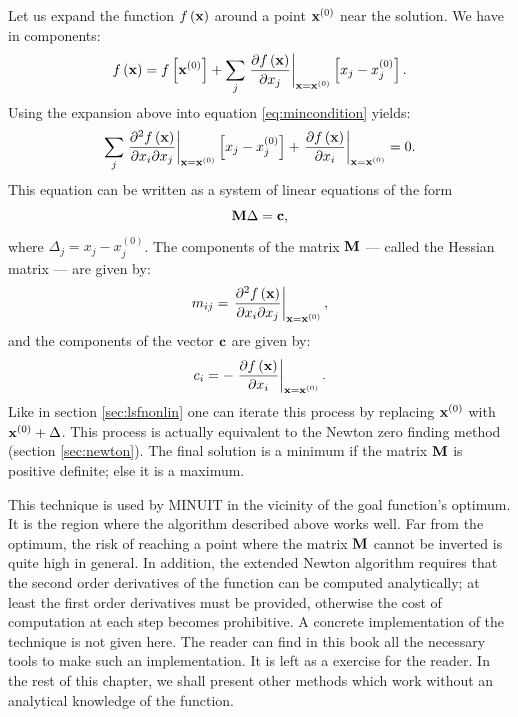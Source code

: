 Let us expand the function $f\left({\textbf x}\right)$ around a point
${\textbf x}^{\left(0\right)}$ near the solution.
We have in components:
\begin{equation}
  f\left({\textbf x}\right) = f\left[{\textbf x}^{\left(0\right)}\right] +\sum_j
  \left.{\partial f\left({\textbf x}\right) \over \partial x_j}\right|_{{\textbf x}={\textbf
  x}^{\left(0\right)}}
  \left[x_j-x^{\left(0\right)}_j\right].
\end{equation}
Using the expansion above into equation \ref{eq:mincondition}
yields:
\begin{equation}
\sum_j
  \left.{\partial^2 f\left({\textbf x}\right) \over \partial x_i\partial x_j}\right|_{{\textbf x}={\textbf
  x}^{\left(0\right)}}
  \left[x_j-x^{\left(0\right)}_j\right]
  + \left.{\partial f\left({\textbf x}\right) \over \partial x_i}\right|_{{\textbf x}={\textbf
  x}^{\left(0\right)}} =0.
\end{equation}
This equation can be written as a system of linear equations of
the form
\begin{equation}
  {\textbf M}\Delta = {\textbf c},
\end{equation}
where $\Delta_j =x_j-x^{\left(0\right)}_j$. The components of the
matrix ${\textbf M}$ --- called the Hessian matrix --- are given by:
\begin{equation}
  m_{ij} = \left.{\partial^2 f\left({\textbf x}\right) \over \partial x_i\partial x_j}\right|_{{\textbf x}={\textbf
  x}^{\left(0\right)}},
\end{equation}
and the components of the vector ${\textbf c}$ are given by:
\begin{equation}
  c_i = -\left.{\partial f\left({\textbf x}\right) \over \partial x_i}\right|_{{\textbf x}={\textbf
  x}^{\left(0\right)}}.
\end{equation}
Like in section \ref{sec:lsfnonlin} one can iterate this process
by replacing ${\textbf x}^{\left(0\right)}$ with ${\textbf
x}^{\left(0\right)}+\Delta$. This process is actually equivalent
to the Newton zero finding method (\cf section \ref{sec:newton}).
The final solution is a minimum if the matrix ${\textbf M}$ is
positive definite; else it is a maximum.

This technique is used by MINUIT in the vicinity of the goal
function's optimum. It is the region where the algorithm described
above works well. Far from the optimum, the risk of reaching a
point where the matrix ${\textbf M}$ cannot be inverted is quite high
in general. In addition, the extended Newton algorithm requires
that the second order derivatives of the function can be computed
analytically; at least the first order derivatives must be
provided, otherwise the cost of computation at each step becomes
prohibitive. A concrete implementation of the technique is not
given here. The reader can find in this book all the necessary
tools to make such an implementation. It is left as a exercise for
the reader. In the rest of this chapter, we shall present other
methods which work without an analytical knowledge of the
function.

